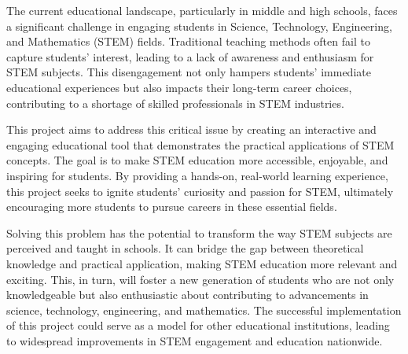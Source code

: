 The current educational landscape, particularly in middle and high schools, faces a significant challenge in engaging students in Science, Technology, Engineering, and Mathematics (STEM) fields. Traditional teaching methods often fail to capture students' interest, leading to a lack of awareness and enthusiasm for STEM subjects. This disengagement not only hampers students' immediate educational experiences but also impacts their long-term career choices, contributing to a shortage of skilled professionals in STEM industries.

This project aims to address this critical issue by creating an interactive and engaging educational tool that demonstrates the practical applications of STEM concepts. The goal is to make STEM education more accessible, enjoyable, and inspiring for students. By providing a hands-on, real-world learning experience, this project seeks to ignite students' curiosity and passion for STEM, ultimately encouraging more students to pursue careers in these essential fields.

Solving this problem has the potential to transform the way STEM subjects are perceived and taught in schools. It can bridge the gap between theoretical knowledge and practical application, making STEM education more relevant and exciting. This, in turn, will foster a new generation of students who are not only knowledgeable but also enthusiastic about contributing to advancements in science, technology, engineering, and mathematics. The successful implementation of this project could serve as a model for other educational institutions, leading to widespread improvements in STEM engagement and education nationwide.
